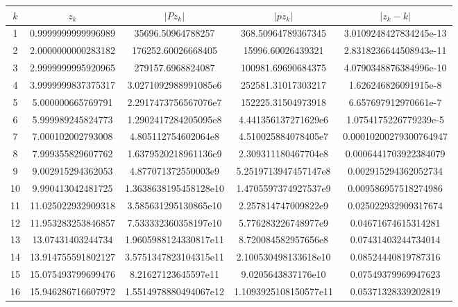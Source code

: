\documentclass[15pt, a4paper]{article}
\begin{document}
\begin{table}[h]
    \centering
    \begin{adjustbox}{max width=\textwidth}
    \begin{tabular}{|c|c|c|c|c|}
        \hline
        \(k\) & \(z_k\) & \(|Pz_k|\) & \(|pz_k|\) & \(|z_k - k|\) \\ \hline
        1 & 0.9999999999996989 & 35696.50964788257 & 368.50964789367345 & 3.0109248427834245e-13 \\ \hline
        2 & 2.0000000000283182 & 176252.60026668405 & 15996.60026439321 & 2.8318236644508943e-11 \\ \hline
        3 & 2.9999999995920965 & 279157.6968824087 & 100981.69690684375 & 4.0790348876384996e-10 \\ \hline
        4 & 3.9999999837375317 & 3.0271092988991085e6 & 252581.31017303217 & 1.626246826091915e-8 \\ \hline
        5 & 5.000000665769791 & 2.2917473756567076e7 & 152225.31504973918 & 6.657697912970661e-7 \\ \hline
        6 & 5.999989245824773 & 1.2902417284205095e8 & 4.441356137271629e6 & 1.0754175226779239e-5 \\ \hline
        7 & 7.000102002793008 & 4.805112754602064e8 & 4.510025884078405e7 & 0.00010200279300764947 \\ \hline
        8 & 7.999355829607762 & 1.6379520218961136e9 & 2.309311180467704e8 & 0.0006441703922384079 \\ \hline
        9 & 9.002915294362053 & 4.877071372550003e9 & 5.2519713947457147e8 & 0.002915294362052734 \\ \hline
        10 & 9.990413042481725 & 1.3638638195458128e10 & 1.4705597374927537e9 & 0.009586957518274986 \\ \hline
        11 & 11.025022932909318 & 3.585631295130865e10 & 2.257814747009822e9 & 0.025022932909317674 \\ \hline
        12 & 11.953283253846857 & 7.533332360358197e10 & 5.776283226748977e9 & 0.04671674615314281 \\ \hline
        13 & 13.07431403244734 & 1.9605988124330817e11 & 8.720084582957656e8 & 0.07431403244734014 \\ \hline
        14 & 13.914755591802127 & 3.5751347823104315e11 & 2.100530498133618e10 & 0.08524440819787316 \\ \hline
        15 & 15.075493799699476 & 8.21627123645597e11 & 9.0205643837176e10 & 0.07549379969947623 \\ \hline
        16 & 15.946286716607972 & 1.5514978880494067e12 & 1.1093925108150577e11 & 0.05371328339202819 \\ \hline

\end{tabular}
\end{adjustbox}
\end{table}
\end{document}
